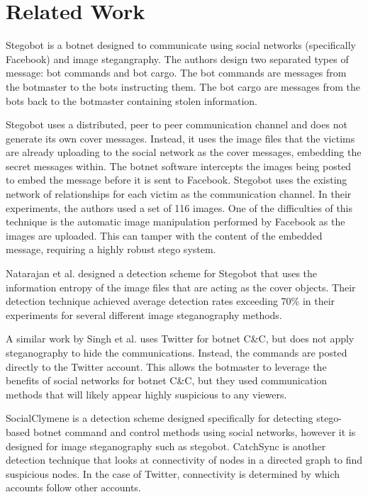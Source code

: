 \section{Related Work}
\label{subsec:lit-review:botnets:related-work}

Stegobot \cite{stegobot} is a botnet designed to communicate using
social networks (specifically Facebook) and image stegangraphy.  The authors
design two separated types of message: bot commands and bot cargo.  The bot
commands are messages from the botmaster to the bots instructing them.  The bot
cargo are messages from the bots back to the botmaster containing stolen
information.

Stegobot \cite{stegobot} uses a distributed, peer to peer communication channel
and does not generate its own cover messages.  Instead, it uses the image files that the
victims are already uploading to the social network as the cover messages,
embedding the secret messages within.  The botnet software intercepts the images
being posted to embed the message before it is sent to Facebook.  Stegobot uses
the existing network of relationships for each victim as the communication
channel.  In their experiments, the authors used a set of 116 images.  One of
the difficulties of this technique is the automatic image manipulation performed
by Facebook as the images are uploaded.  This can tamper with the content of the
embedded message, requiring a highly robust stego system.

Natarajan et al. \cite{stegobot-detect} designed a detection scheme for Stegobot
that uses the information entropy of the image files that are acting as the
cover objects.  Their detection technique achieved average detection rates
exceeding 70\% in their experiments for several different image steganography
methods.

A similar work by Singh et al. \cite{twitter-botnet} uses Twitter for
botnet C\&C, but does not apply steganography to hide the communications.
Instead, the commands are posted directly to the Twitter account.  This allows
the botmaster to leverage the benefits of social networks for botnet C\&C, but
they used communication methods that will likely appear highly suspicious to any
viewers.

SocialClymene \cite{socialclymene} is a detection scheme designed specifically
for detecting stego-based botnet command and control methods using social networks,
however it is designed for image steganography such as stegobot.  CatchSync
\cite{catchsync} is another detection technique that looks at connectivity of
nodes in a directed graph to find suspicious nodes.  In the case of Twitter,
connectivity is determined by which accounts follow other accounts.


